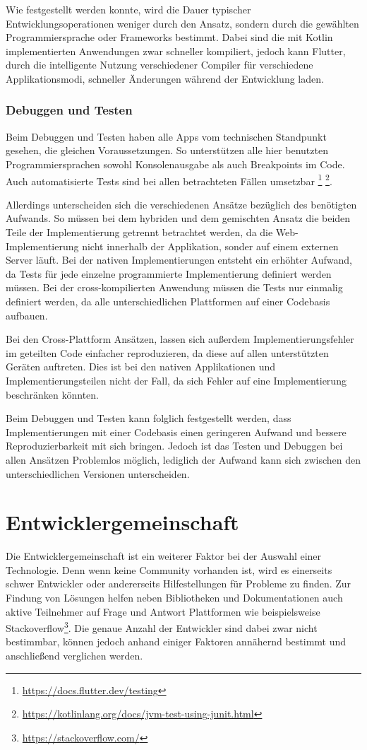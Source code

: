 Wie festgestellt werden konnte, wird die Dauer typischer Entwicklungsoperationen weniger durch den Ansatz, sondern durch die gewählten Programmiersprache oder Frameworks bestimmt. Dabei sind die mit Kotlin implementierten Anwendungen zwar schneller kompiliert, jedoch kann Flutter, durch die intelligente Nutzung verschiedener Compiler für verschiedene Applikationsmodi, schneller Änderungen während der Entwicklung laden.

\subsubsection{Debuggen und Testen}
Beim Debuggen und Testen haben alle Apps vom technischen Standpunkt gesehen, die gleichen Voraussetzungen. So unterstützen alle hier benutzten Programmiersprachen sowohl Konsolenausgabe als auch Breakpoints im Code. Auch automatisierte Tests sind bei allen betrachteten Fällen umsetzbar \footnote{\url{https://docs.flutter.dev/testing}} \footnote{\url{https://kotlinlang.org/docs/jvm-test-using-junit.html}}.

Allerdings unterscheiden sich die verschiedenen Ansätze bezüglich des benötigten Aufwands. So müssen bei dem hybriden und dem gemischten Ansatz die beiden Teile der Implementierung getrennt betrachtet werden, da die Web-Implementierung nicht innerhalb der Applikation, sonder auf einem externen Server läuft. Bei der nativen Implementierungen entsteht ein erhöhter Aufwand, da Tests für jede einzelne programmierte Implementierung definiert werden müssen. Bei der cross-kompilierten Anwendung müssen die Tests nur einmalig definiert werden, da alle unterschiedlichen Plattformen auf einer Codebasis aufbauen.

Bei den Cross-Plattform Ansätzen, lassen sich außerdem Implementierungsfehler im geteilten Code einfacher reproduzieren, da diese auf allen unterstützten Geräten auftreten. Dies ist bei den nativen Applikationen und Implementierungsteilen nicht der Fall, da sich Fehler auf eine Implementierung beschränken könnten.

Beim Debuggen und Testen kann folglich festgestellt werden, dass Implementierungen mit einer Codebasis einen geringeren Aufwand und bessere Reproduzierbarkeit mit sich bringen. Jedoch ist das Testen und Debuggen bei allen Ansätzen Problemlos möglich, lediglich der Aufwand kann sich zwischen den unterschiedlichen Versionen unterscheiden.

\section{Entwicklergemeinschaft}
Die Entwicklergemeinschaft ist ein weiterer Faktor bei der Auswahl einer Technologie. Denn wenn keine Community vorhanden ist, wird es einerseits schwer Entwickler oder andererseits Hilfestellungen für Probleme zu finden. Zur Findung von Lösungen helfen neben Bibliotheken und Dokumentationen auch aktive Teilnehmer auf Frage und Antwort Plattformen wie beispielsweise Stackoverflow\footnote{\url{https://stackoverflow.com/}}.
Die genaue Anzahl der Entwickler sind dabei zwar nicht bestimmbar, können jedoch anhand einiger Faktoren annähernd bestimmt und anschließend verglichen werden.

